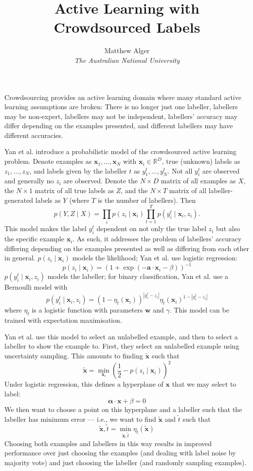 \documentclass[a4paper]{article}
\renewcommand{\vec}{\boldsymbol}
\newcommand{\vectilde}[1]{\tilde{\boldsymbol{#1}}}
\begin{document}
    \title{Active Learning with Crowdsourced Labels}
    \author{Matthew Alger \\ \emph{The Australian National University}}
    \maketitle

    Crowdsourcing provides an active learning domain where many standard active learning assumptions are broken: There is no longer just one labeller, labellers may be non-expert, labellers may not be independent, labellers' accuracy may differ depending on the examples presented, and different labellers may have different accuracies.

    Yan et al.\cite{yan10} introduce a probabilistic model of the crowdsourced active learning problem. Denote examples as $\vec x_1, \dots, \vec x_N$ with $\vec x_i \in \mathbb{R}^D$, true (unknown) labels as $z_1, \dots, z_N$, and labels given by the labeller $t$ as $y^t_1, \dots, y^t_N$. Not all $y^t_i$ are observed and generally no $z_i$ are observed. Denote the $N \times D$ matrix of all examples as $X$, the $N \times 1$ matrix of all true labels as $Z$, and the $N \times T$ matrix of all labeller-generated labels as $Y$ (where $T$ is the number of labellers). Then
    \[
        p(Y, Z \mid X) = \prod_i p(z_i \mid \vec x_i) \prod_{t = 1}^T p(y^t_i \mid \vec x_i, z_i).
    \]
    This model makes the label $y^t_i$ dependent on not only the true label $z_i$ but also the specific example $\vec x_i$. As such, it addresses the problem of labellers' accuracy differing depending on the examples presented as well as differing from each other in general. $p(z_i \mid \vec x_i)$ models the likelihood; Yan et al. use logistic regression:
    \[
        p(z_i \mid \vec x_i) = (1 + \exp(- \vec a \cdot \vec x_i - \beta))^{-1}
    \]
    $p(y^t_i \mid \vec x_i, z_i)$ models the labeller; for binary classification, Yan et al. use a Bernoulli model with
    \[
        p(y^t_i \mid \vec x_i, z_i) = (1 - \eta_t(\vec x_i))^{|y^t_i - z_i|} \eta_t(\vec x_i)^{1 - |y^t_i - z_i|}
    \]
    where $\eta_t$ is a logistic function with parameters $\vec w$ and $\gamma$. This model can be trained with expectation maximisation.

    Yan et al.\cite{yan11} use this model to select an unlabelled example, and then to select a labeller to show the example to. First, they select an unlabelled example using uncertainty sampling\cite{lewis94}. This amounts to finding $\vectilde x$ such that
    \[
        \vectilde x = \min_{\vec x_i} \left(\frac{1}{2} - p(z_i \mid \vec x_i)\right)^2
    \]
    Under logistic regression, this defines a hyperplane of $\vec x$ that we may select to label:
    \[
        \vec \alpha \cdot \vec x + \beta = 0
    \]
    We then want to choose a point on this hyperplane and a labeller such that the labeller has minimum error --- i.e., we want to find $\vectilde x$ and $\tilde t$ such that
    \[
        \vectilde x, \tilde t = \min_{\vectilde x, \tilde t} \eta_t(\vectilde x)
    \]
    Choosing both examples and labellers in this way results in improved performance over just choosing the examples (and dealing with label noise by majority vote) and just choosing the labeller (and randomly sampling examples).

    
    
\end{document}
